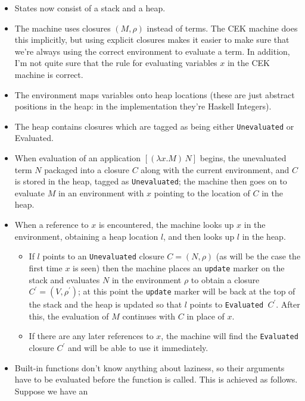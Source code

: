 \documentclass[a4paper]{article}
\begin{document}
\begin{itemize}
\item States now consist of a stack and a heap.
\item The machine uses closures $(M,\rho)$ instead of terms.  The CEK
  machine does this implicitly, but using explicit closures makes
  it easier to make sure that we're always using the correct
  environment to evaluate a term.  In addition, I'm not quite sure
  that the rule for evaluating variables $x$ in the CEK machine is
  correct.
\item The environment maps variables onto heap locations (these are
  just abstract positions in the heap: in the implementation they're
  Haskell Integers).
\item The heap contains closures which are tagged as being either
  \texttt{Unevaluated} or {Evaluated}.
\item When evaluation of an application $[(\lambda x.M)\, N]$ begins,
  the unevaluated term $N$ packaged into a closure $C$ along with the current
  environment, and $C$ is stored in the heap, tagged as 
  \texttt{Unevaluated}; the machine then goes on to evaluate $M$ in an
  environment with $x$ pointing to the location of $C$ in the heap.
\item When a reference to $x$ is encountered, the machine looks up $x$
  in the environment, obtaining a heap location $l$, and then looks up
  $l$ in the heap.  
  \begin{itemize} 
    \item If $l$ points to an \texttt{Unevaluated} closure $C = (N,
      \rho)$ (as will be the case the first time $x$ is seen) then the
      machine places an \texttt{update} marker on the stack and
      evaluates $N$ in the environment $\rho$ to obtain a closure $C^{\prime} =
      (V, \rho^{\prime})$; at this point the \texttt{update} marker
      will be back at the top of the stack and the heap is updated so
      that $l$ points to \texttt{Evaluated $C^{\prime}$}.  After this, the evaluation
      of $M$ continues with $C$ in place of $x$.
    \item If there are any later references to $x$, the machine will find
      the \texttt{Evaluated} closure $C^\prime$ and will be able to use it immediately.
  \end{itemize}
  \item Built-in functions don't know anything about laziness, so
    their arguments have to be evaluated before the function is
    called.  This is achieved as follows.  Suppose we have an

\end{itemize}
\end{document}
